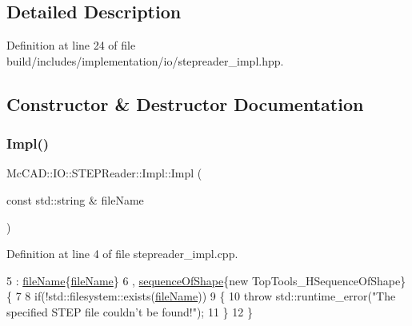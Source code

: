 \subsection{Detailed Description}


Definition at line 24 of file build/includes/implementation/io/stepreader\+\_\+impl.\+hpp.



\subsection{Constructor \& Destructor Documentation}
\mbox{\label{classMcCAD_1_1IO_1_1STEPReader_1_1Impl_a5be8cf4f0e40571ffdff4ecba69265ce}} 
\subsubsection{\texorpdfstring{Impl()}{Impl()}\hspace{0.1cm}{\footnotesize\ttfamily [1/2]}}
{\footnotesize\ttfamily Mc\+C\+A\+D\+::\+I\+O\+::\+S\+T\+E\+P\+Reader\+::\+Impl\+::\+Impl (\begin{DoxyParamCaption}\item[{const std\+::string \&}]{file\+Name }\end{DoxyParamCaption})}



Definition at line 4 of file stepreader\+\_\+impl.\+cpp.


\begin{DoxyCode}
5     : \hyperlink{classMcCAD_1_1IO_1_1STEPReader_1_1Impl_ad06c3157407f90e8a4b4524da0c9ceba}{fileName}\{\hyperlink{classMcCAD_1_1IO_1_1STEPReader_1_1Impl_ad06c3157407f90e8a4b4524da0c9ceba}{fileName}\}
6     , \hyperlink{classMcCAD_1_1IO_1_1STEPReader_1_1Impl_a420bbc46a0f7740eca71ef5aa6ce5e55}{sequenceOfShape}\{\textcolor{keyword}{new} TopTools\_HSequenceOfShape\}\{
7       
8     \textcolor{keywordflow}{if}(!std::filesystem::exists(\hyperlink{classMcCAD_1_1IO_1_1STEPReader_1_1Impl_ad06c3157407f90e8a4b4524da0c9ceba}{fileName}))
9       \{
10       \textcolor{keywordflow}{throw} std::runtime\_error(\textcolor{stringliteral}{"The specified STEP file couldn't be found!"});
11       \}
12 \}
\end{DoxyCode}
\mbox{\label{classMcCAD_1_1IO_1_1STEPReader_1_1Impl_a5be8cf4f0e40571ffdff4ecba69265ce}} 
